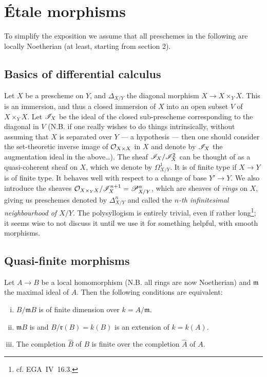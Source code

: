 \setcounter{chapter}{0}
\chapter{Étale morphisms}

To simplify the exposition we assume that all preschemes in the following are locally Noetherian (at least, starting from section 2).


\section{Basics of differential calculus}

Let $X$ be a prescheme on $Y$, and $\Delta_{X/Y}$ the diagonal morphism $X\to X\times_Y X$.
This is an immersion, and thus a closed immersion of $X$ into an open subset $V$ of $X\times_Y X$.
Let $\mathscr{I}_X$ be the ideal of the closed sub-prescheme corresponding to the diagonal in $V$ (N.B. if one really wishes to do things intrinsically, without assuming that $X$ is separated over $Y$ — a  hypothesis — then one should consider the set-theoretic inverse image of $\mathcal{O}_{X\times X}$ in $X$ and denote by $\mathscr{I}_X$ the augmentation ideal in the above\ldots).
The sheaf $\mathscr{I}_X/\mathscr{I}_X^2$ can be thought of as a quasi-coherent sheaf on $X$, which we denote by $\Omega_{X/Y}^1$.
It is of finite type if $X\to Y$ is of finite type.
It behaves well with respect to a change of base $Y'\to Y$.
We also introduce the sheaves $\mathcal{O}_{X\times_Y X}/\mathscr{I}_X^{n+1}=\mathscr{P}^n_{X/Y}$, which are sheaves of \emph{rings} on $X$, giving us preschemes denoted by $\Delta_{X/Y}^n$ and called the \emph{$n$-th infinitesimal neighbourhood of $X/Y$}.
The polysyllogism is entirely trivial, even if rather long\footnote{cf. EGA~IV~16.3.}; it seems wise to not discuss it until we use it for something helpful, with smooth morphisms.


\section{Quasi-finite morphisms}

\begin{prop}
    Let $A\to B$ be a local homomorphism (N.B. all rings are now Noetherian) and $\mathfrak{m}$ the maximal ideal of $A$.
    Then the following conditions are equivalent:
    \begin{enumerate}[(i)]
        \item $B/\mathfrak{m}B$ is of finite dimension over $k=A/\mathfrak{m}$.
        \item $\mathfrak{m}B$ is \unsure{[\ldots]} and $B/\mathfrak{r}(B)=k(B)$ is an extension of $k=k(A)$.
        \item The completion $\hat{B}$ of $B$ is finite over the completion $\hat{A}$ of $A$.
    \end{enumerate}
\end{prop}

